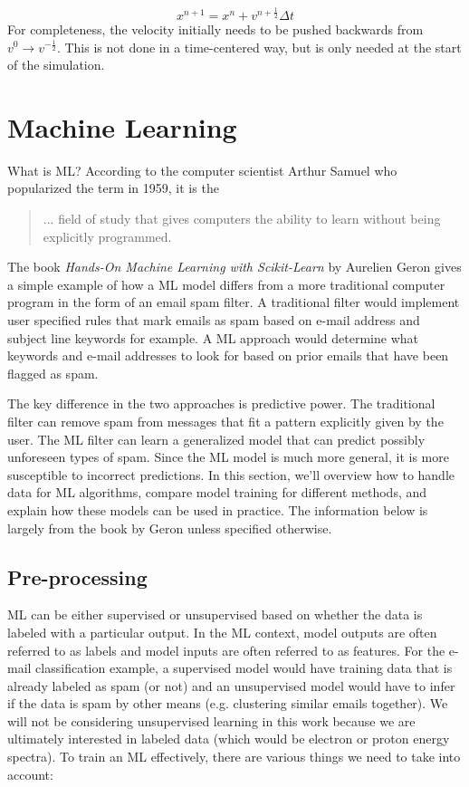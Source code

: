 \begin{equation}
	x^{n+1} = x^{n} + v^{n+\frac{1}{2}} \Delta t \label{eq:particlepush}
\end{equation}
For completeness, the velocity initially needs to be pushed backwards from $v^{0} \rightarrow v^{-\frac{1}{2}}$. This is not done in a time-centered way, but is only needed at the start of the simulation. 

\section{Machine Learning}
What is \gls{ML}? According to the computer scientist Arthur Samuel who popularized the term in 1959, it is the 

\begin{quote}
	... field of study that gives computers the ability to learn without being explicitly programmed. \cite{Geron_2023_ML}
\end{quote}

The book \emph{Hands-On Machine Learning with Scikit-Learn} by Aurelien Geron \cite{Geron_2023_ML} gives a simple example of how a \gls{ML} model differs from a more traditional computer program in the form of an email spam filter. A traditional filter would implement user specified rules that mark emails as spam based on e-mail address and subject line keywords for example. A \gls{ML} approach would determine what keywords and e-mail addresses to look for based on prior emails that have been flagged as spam.

The key difference in the two approaches is predictive power. The traditional filter can remove spam from messages that fit a pattern explicitly given by the user. The \gls{ML} filter can learn a generalized model that can predict possibly unforeseen types of spam. Since the \gls{ML} model is much more general, it is more susceptible to incorrect predictions. In this section, we'll overview how to handle data for \gls{ML} algorithms, compare model training for different methods, and explain how these models can be used in practice. The information below is largely from the book by Geron \cite{Geron_2023_ML} unless specified otherwise.

\subsection{Pre-processing}
\gls{ML} can be either supervised or unsupervised based on whether the data is labeled with a particular output. In the \gls{ML} context, model outputs are often referred to as labels and model inputs are often referred to as features. For the e-mail classification example, a supervised model would have training data that is already labeled as spam (or not) and an unsupervised model would have to infer if the data is spam by other means (e.g. clustering similar emails together). We will not be considering unsupervised learning in this work because we are ultimately interested in labeled data (which would be electron or proton energy spectra). To train an \gls{ML} effectively, there are various things we need to take into account: 

